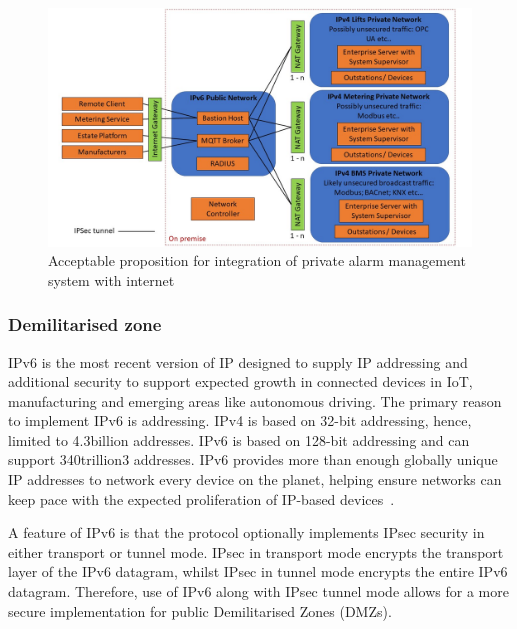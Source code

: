 \documentclass[11pt, oneside]{article}   	%
\begin{document}
\pagebreak

\FloatBarrier
\begin{figure}
\begin{center}
\includegraphics[width=1\textwidth]{acceptablePublicNetwork.jpg}
\caption{Acceptable proposition for integration of private alarm management system with internet}
\label{Integrated Network Configuration figure}
\end{center}
\end{figure}
\FloatBarrier

\pagebreak

\subsubsection{Demilitarised zone}
IPv6 is the most recent version of IP designed to supply IP addressing and additional security to support expected growth in connected devices in IoT, manufacturing and emerging areas like autonomous driving.
The primary reason to implement IPv6 is addressing. 
IPv4 is based on 32-bit addressing, hence, limited to 4.3billion addresses.
IPv6 is based on 128-bit addressing and can support 340trillion3 addresses.
IPv6 provides more than enough globally unique IP addresses to network every device on the planet, helping ensure networks can keep pace with the expected proliferation of IP-based devices~\cite{ipv6}.\

A feature of IPv6 is that the protocol optionally implements IPsec security in either transport or tunnel mode.
IPsec in transport mode encrypts the transport layer of the IPv6 datagram, whilst IPsec in tunnel mode encrypts the entire IPv6 datagram.
Therefore, use of IPv6 along with IPsec tunnel mode allows for a more secure implementation for public Demilitarised Zones (DMZs).\
\end{document}
